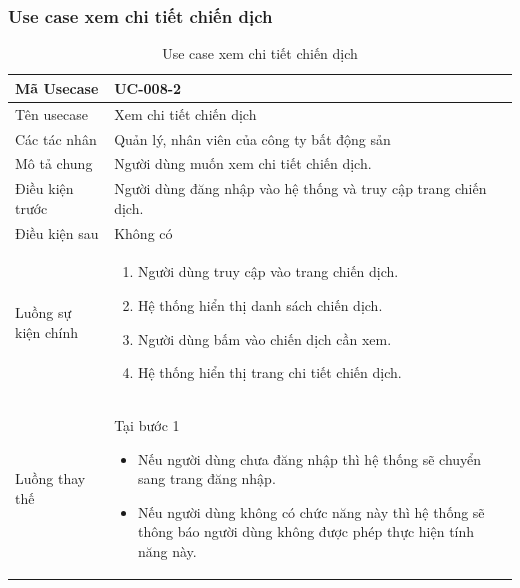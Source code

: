 \documentclass[12pt,a4paper]{article}
\begin{document}
    \subsubsection*{Use case xem chi tiết chiến dịch}
    \begin{table}[H]
        \centering
        \begin{tabular}{|p{3.5cm}|p{11.5cm}|c|}
            \hline
            Mã Usecase      & UC-008-2                                                        \\
            \hline
            Tên usecase     & Xem chi tiết chiến dịch                                         \\
            \hline
            Các tác nhân    & Quản lý, nhân viên của công ty bất động sản                     \\
            \hline
            Mô tả chung     & Người dùng muốn xem chi tiết chiến dịch.                        \\
            \hline

            Điều kiện trước & Người dùng đăng nhập vào hệ thống và truy cập trang chiến dịch. \\
            \hline

            Điều kiện sau   & Không có                                                        \\
            \hline

            Luồng sự kiện chính & \vspace{-.8cm}\begin{enumerate}
                                                    \item Người dùng truy cập vào trang chiến dịch.
                                                    \item Hệ thống hiển thị danh sách chiến dịch.
                                                    \item Người dùng bấm vào chiến dịch cần xem.
                                                    \item Hệ thống hiển thị trang chi tiết chiến dịch.
            \end{enumerate}
            \\
            \hline
            Luồng thay thế & Tại bước 1\newline
            \vspace{-.8cm}\begin{itemize}
                              \item Nếu người dùng chưa đăng nhập thì hệ thống sẽ chuyển sang trang đăng nhập.
                              \item  Nếu người dùng không có chức năng này thì hệ thống sẽ thông báo người dùng không được phép thực hiện tính năng này.
            \end{itemize}

            \\    \hline
        \end{tabular}
        \caption{Use case xem chi tiết chiến dịch}
    \end{table}
\end{document}
